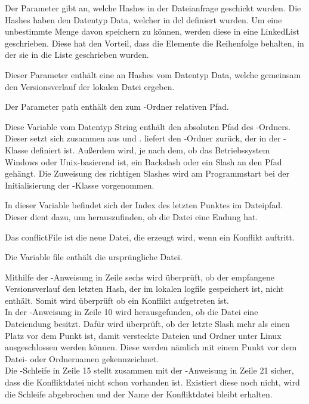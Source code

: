 \begin{description}
	 Der Parameter gibt an, welche Hashes in der Dateianfrage geschickt wurden. Die Hashes haben den Datentyp Data, welcher in \gls{dcl} definiert wurden. Um eine unbestimmte Menge davon speichern zu können, werden diese in eine LinkedList geschrieben. Diese hat den Vorteil, dass die Elemente die Reihenfolge behalten, in der sie in die Liste geschrieben wurden.
	
	 Dieser Parameter enthält eine  an Hashes vom Datentyp Data, welche gemeinsam den Versionsverlauf der lokalen Datei ergeben. 
	
	 Der Parameter path enthält den zum \sblit-Ordner relativen Pfad.
	
	 Diese Variable vom Datentyp String enthält den absoluten Pfad des \sblit-Ordners. Dieser setzt sich zusammen aus  und .  liefert den \sblit-Ordner zurück, der in der -Klasse definiert ist. Außerdem wird, je nach dem, ob das Betriebssystem Windows oder Unix-basierend ist, ein Backslash oder ein Slash an den Pfad gehängt. Die Zuweisung des richtigen Slashes wird am Programmstart bei der Initialisierung der -Klasse vorgenommen.

	 In dieser Variable befindet sich der Index des letzten Punktes im Dateipfad. Dieser dient dazu, um herauszufinden, ob die Datei eine Endung hat.
	
	 Das conflictFile ist die neue Datei, die erzeugt wird, wenn ein Konflikt auftritt.
	
	 Die Variable file enthält die ursprüngliche Datei.
\end{description}
Mithilfe der -Anweisung in Zeile sechs wird überprüft, ob der empfangene Versionsverlauf den letzten Hash, der im lokalen \gls{logfile} gespeichert ist, nicht enthält. Somit wird überprüft ob ein Konflikt aufgetreten ist. \\
In der -Anweisung in Zeile 10 wird herausgefunden, ob die Datei eine Dateiendung besitzt. Dafür wird überprüft, ob der letzte Slash mehr als einen Platz vor dem Punkt ist, damit versteckte Dateien und Ordner unter Linux ausgeschlossen werden können. Diese werden nämlich mit einem Punkt vor dem Datei- oder Ordnernamen gekennzeichnet.\\
Die -Schleife in Zeile 15 stellt zusammen mit der -Anweisung in Zeile 21 sicher, dass die Konfliktdatei nicht schon vorhanden ist. Existiert diese noch nicht, wird die Schleife abgebrochen und der Name der Konfliktdatei bleibt erhalten.